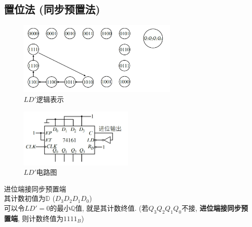 \documentclass[scheme=chinese,a4paper]{report}
\begin{document}
\subsection{置位法 (同步预置法)}
\begin{figure}[H]
\centering
\includegraphics[width=0.7\textwidth]{counter_ld.png}
\caption{$LD'$逻辑表示}
\end{figure}
\begin{figure}[H]
\centering
\includegraphics[width=0.5\textwidth]{counter_ld_circuit.png}
\caption{$LD'$电路图}
\end{figure}
进位端接同步预置端\\
其计数初值为$\mathbb{D}$ ($D_3D_2D_1D_0$)\\
可以令$LD'=0$的最小$\mathbb{Q}$值, 就是其计数终值. (若$Q_3Q_2Q_1Q_0$不接, \textbf{进位端接同步预置端}, 则计数终值为$1111_B$)\\
\end{document}

